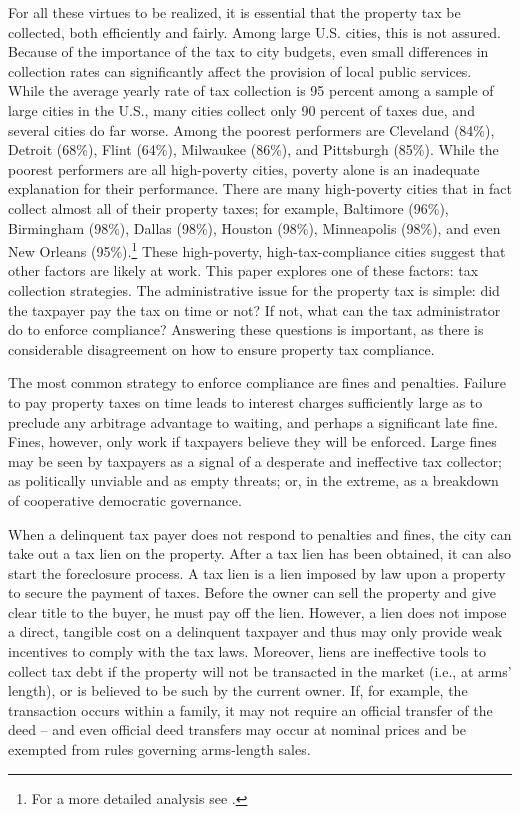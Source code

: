 \documentclass[12pt]{article}
\begin{document}
For all these virtues to be realized, it is essential that the
property tax be collected, both efficiently and fairly.  Among large
U.S. cities, this is not assured.  Because of the importance of the
tax to city budgets, even small differences in collection rates can
significantly affect the provision of local public services. While the
average yearly rate of tax collection is 95 percent among a sample of
large cities in the U.S., many cities collect only 90 percent of taxes
due, and several cities do far worse.  Among the poorest performers
are Cleveland (84\%), Detroit (68\%), Flint (64\%), Milwaukee (86\%),
and Pittsburgh (85\%). While the poorest performers are all
high-poverty cities, poverty alone is an inadequate explanation for
their performance. There are many high-poverty cities that in fact
collect almost all of their property taxes; for example, Baltimore
(96\%), Birmingham (98\%), Dallas (98\%), Houston (98\%), Minneapolis
(98\%), and even New Orleans (95\%).\footnote{For a more detailed
  analysis see .}  These high-poverty,
high-tax-compliance cities suggest that other factors are likely at
work.  This paper explores one of these factors: tax collection
strategies. The administrative issue for the property tax is simple:
did the taxpayer pay the tax on time or not?  If not, what can the tax
administrator do to enforce compliance?  Answering these questions is
important, as there is considerable disagreement on how to ensure
property tax compliance.

The most common strategy to enforce compliance are fines and
penalties.  Failure to pay property taxes on time leads to interest
charges sufficiently large as to preclude any arbitrage advantage to
waiting, and perhaps a significant late fine.  Fines, however, only
work if taxpayers believe they will be enforced.  Large fines may be
seen by taxpayers as a signal of a desperate and ineffective tax
collector; as politically unviable and as empty threats; or, in the
extreme, as a breakdown of cooperative democratic governance.

When a delinquent tax payer does not respond to penalties and fines,
the city can take out a tax lien on the property.  After a tax lien
has been obtained, it can also start the foreclosure process.  A tax
lien is a lien imposed by law upon a property to secure the payment of
taxes.  Before the owner can sell the property and give clear title to
the buyer, he must pay off the lien. However, a lien does not impose a
direct, tangible cost on a delinquent taxpayer and thus may only
provide weak incentives to comply with the tax laws. Moreover, liens
are ineffective tools to collect tax debt if the property will not be
transacted in the market (i.e., at arms' length), or is believed to be
such by the current owner. If, for example, the transaction occurs
within a family, it may not require an official transfer of the deed
-- and even official deed transfers may occur at nominal prices and be
exempted from rules governing arms-length sales.
\end{document}
